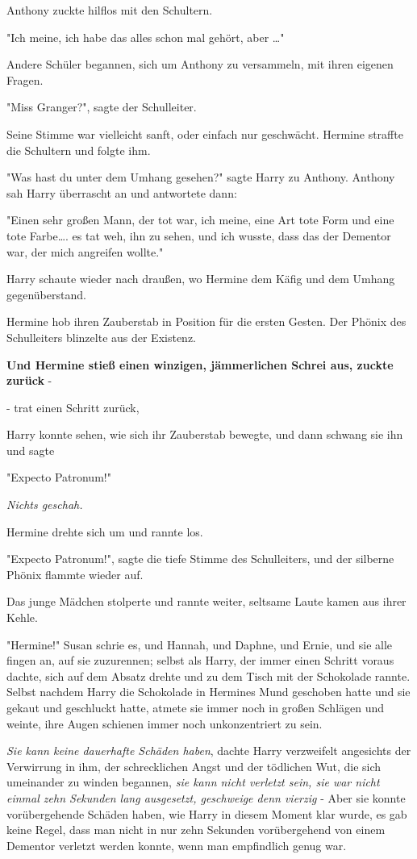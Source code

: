{Anthony zuckte hilflos mit den Schultern.

"Ich meine, ich habe das alles schon mal gehört, aber …"

Andere Schüler begannen, sich um Anthony zu versammeln, mit ihren eigenen Fragen.

"Miss Granger?", sagte der Schulleiter.

Seine Stimme war vielleicht sanft, oder einfach nur geschwächt. Hermine straffte die Schultern und folgte ihm.

"Was hast du unter dem Umhang gesehen?" sagte Harry zu Anthony. Anthony sah Harry überrascht an und antwortete dann:

"Einen sehr großen Mann, der tot war, ich meine, eine Art tote Form und eine tote Farbe…. es tat weh, ihn zu sehen, und ich wusste, dass das der Dementor war, der mich angreifen wollte."

Harry schaute wieder nach draußen, wo Hermine dem Käfig und dem Umhang gegenüberstand.

Hermine hob ihren Zauberstab in Position für die ersten Gesten. Der Phönix des Schulleiters blinzelte aus der Existenz.

\textbf{Und Hermine stieß einen winzigen, jämmerlichen Schrei aus, zuckte zurück} -

- trat einen Schritt zurück,

Harry konnte sehen, wie sich ihr Zauberstab bewegte, und dann schwang sie ihn und sagte

"Expecto Patronum!"

\emph{Nichts geschah.}

Hermine drehte sich um und rannte los.

"Expecto Patronum!", sagte die tiefe Stimme des Schulleiters, und der silberne Phönix flammte wieder auf.

Das junge Mädchen stolperte und rannte weiter, seltsame Laute kamen aus ihrer Kehle.

"Hermine!" Susan schrie es, und Hannah, und Daphne, und Ernie, und sie alle fingen an, auf sie zuzurennen; selbst als Harry, der immer einen Schritt voraus dachte, sich auf dem Absatz drehte und zu dem Tisch mit der Schokolade rannte. Selbst nachdem Harry die Schokolade in Hermines Mund geschoben hatte und sie gekaut und geschluckt hatte, atmete sie immer noch in großen Schlägen und weinte, ihre Augen schienen immer noch unkonzentriert zu sein.

\emph{Sie kann keine dauerhafte Schäden haben}, dachte Harry verzweifelt angesichts der Verwirrung in ihm, der schrecklichen Angst und der tödlichen Wut, die sich umeinander zu winden begannen, \emph{sie kann nicht verletzt sein, sie war nicht einmal zehn Sekunden lang ausgesetzt, geschweige denn vierzig} - Aber sie konnte vorübergehende Schäden haben, wie Harry in diesem Moment klar wurde, es gab keine Regel, dass man nicht in nur zehn Sekunden vorübergehend von einem Dementor verletzt werden konnte, wenn man empfindlich genug war.

}
